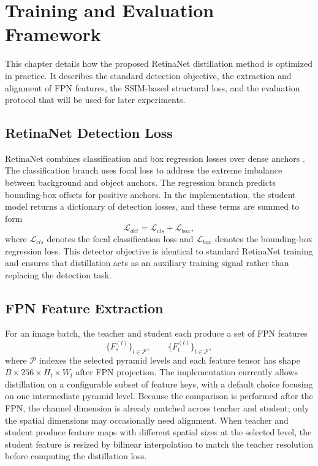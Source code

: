 \chapter{Training and Evaluation Framework}

This chapter details how the proposed RetinaNet distillation method is optimized in practice. It describes the standard detection objective, the extraction and alignment of FPN features, the SSIM-based structural loss, and the evaluation protocol that will be used for later experiments.



\section{RetinaNet Detection Loss}

RetinaNet combines classification and box regression losses over dense anchors \cite{lin2017focal}. The classification branch uses focal loss to address the extreme imbalance between background and object anchors. The regression branch predicts bounding-box offsets for positive anchors. In the implementation, the student model returns a dictionary of detection losses, and these terms are summed to form
\begin{equation}
\mathcal{L}_{det} = \mathcal{L}_{cls} + \mathcal{L}_{box},
\end{equation}
where $\mathcal{L}_{cls}$ denotes the focal classification loss and $\mathcal{L}_{box}$ denotes the bounding-box regression loss. This detector objective is identical to standard RetinaNet training and ensures that distillation acts as an auxiliary training signal rather than replacing the detection task.

\section{FPN Feature Extraction}

For an image batch, the teacher and student each produce a set of FPN features
\begin{equation}
\{F_s^{(l)}\}_{l \in \mathcal{P}}, \qquad \{F_t^{(l)}\}_{l \in \mathcal{P}},
\end{equation}
where $\mathcal{P}$ indexes the selected pyramid levels and each feature tensor has shape $B \times 256 \times H_l \times W_l$ after FPN projection. The implementation currently allows distillation on a configurable subset of feature keys, with a default choice focusing on one intermediate pyramid level. Because the comparison is performed after the FPN, the channel dimension is already matched across teacher and student; only the spatial dimensions may occasionally need alignment. When teacher and student produce feature maps with different spatial sizes at the selected level, the student feature is resized by bilinear interpolation to match the teacher resolution before computing the distillation loss.

